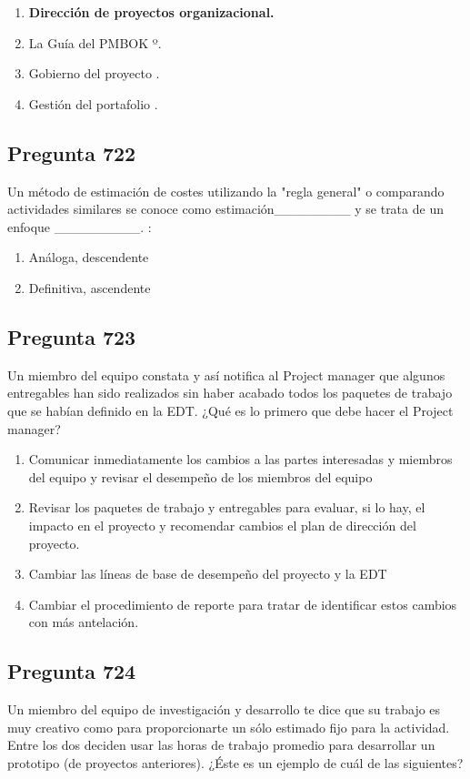 \documentclass[11pt,a4paper]{article}
\begin{document}
\begin{enumerate}[label=\alph*)]
  \item \textbf{Dirección de proyectos organizacional.}
  \item La Guía del PMBOK º.
  \item Gobierno del proyecto .
  \item Gestión del portafolio .
\end{enumerate}

\subsection*{Pregunta 722}
Un método de estimación de costes utilizando la "regla general" o comparando actividades similares se conoce como estimación\_\_\_\_\_\_\_\_ y se trata de un enfoque \_\_\_\_\_\_\_\_\_. :

\begin{enumerate}[label=\alph*)]
  \item Análoga, descendente
  \item Definitiva, ascendente
\end{enumerate}

\subsection*{Pregunta 723}
Un miembro del equipo constata y así notifica al Project manager que algunos entregables han sido realizados sin haber acabado todos los paquetes de trabajo que se habían definido en la EDT. ¿Qué es lo primero que debe hacer el Project manager?

\begin{enumerate}[label=\alph*)]
  \item Comunicar inmediatamente los cambios a las partes interesadas y miembros del equipo y revisar el desempeño de los miembros del equipo
  \item Revisar los paquetes de trabajo y entregables para evaluar, si lo hay, el impacto en el proyecto y recomendar cambios el plan de dirección del proyecto.
  \item Cambiar las líneas de base de desempeño del proyecto y la EDT
  \item Cambiar el procedimiento de reporte para tratar de identificar estos cambios con más antelación.
\end{enumerate}

\subsection*{Pregunta 724}
Un miembro del equipo de investigación y desarrollo te dice que su trabajo es muy creativo como para proporcionarte un sólo estimado fijo para la actividad. Entre los dos deciden usar las horas de trabajo promedio para desarrollar un prototipo (de proyectos anteriores). ¿Éste es un ejemplo de cuál de las siguientes?
\end{document}

